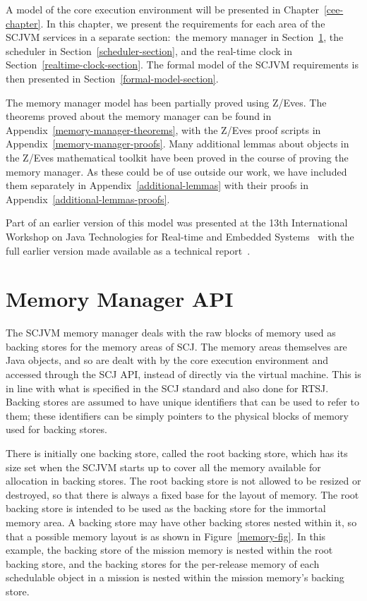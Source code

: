 \documentclass[a4paper,10pt]{report}
\begin{document}
A model of the core execution environment will be presented in
Chapter~\ref{cee-chapter}.
In this chapter, we present the requirements for each area of the
SCJVM services in a separate section:~the memory manager in
Section~\ref{memory-manager-section}, the scheduler in
Section~\ref{scheduler-section}, and the real-time clock in
Section~\ref{realtime-clock-section}.
The formal model of the SCJVM requirements is then presented in
Section~\ref{formal-model-section}.

The memory manager model has been partially proved using Z/Eves.
The theorems proved about the memory manager can be found in
Appendix~\ref{memory-manager-theorems}, with the Z/Eves proof scripts
in Appendix~\ref{memory-manager-proofs}.
Many additional lemmas about objects in the Z/Eves mathematical
toolkit have been proved in the course of proving the memory manager.
As these could be of use outside our work, we have included them
separately in Appendix~\ref{additional-lemmas} with their
proofs in Appendix~\ref{additional-lemmas-proofs}.

Part of an earlier version of this model was presented at the 13th
International Workshop on Java Technologies for Real-time and Embedded
Systems~\cite{baxter2015a} with the full earlier version made available
as a technical report~\cite{baxter2015}.

\section{Memory Manager API}
\label{memory-manager-section}

The SCJVM memory manager deals with the raw blocks of memory used as
backing stores for the memory areas of SCJ.
The memory areas themselves are Java objects, and so are dealt with by
the core execution environment and accessed through the SCJ API,
instead of directly via the virtual machine.
This is in line with what is specified in the SCJ standard and also
done for RTSJ.
Backing stores are assumed to have unique identifiers that can be used
to refer to them; these identifiers can be simply pointers to the
physical blocks of memory used for backing stores.

There is initially one backing store, called the root backing store,
which has its size set when the SCJVM starts up to cover all the
memory available for allocation in backing stores.
The root backing store is not allowed to be resized or destroyed, so
that there is always a fixed base for the layout of memory.
The root backing store is intended to be used as the backing store for
the immortal memory area.
A backing store may have other backing stores nested within it, so
that a possible memory layout is as shown in Figure~\ref{memory-fig}.
In this example, the backing store of the mission memory is nested
within the root backing store, and the backing stores for the
per-release memory of each schedulable object in a mission is nested
within the mission memory's backing store.
\end{document}
